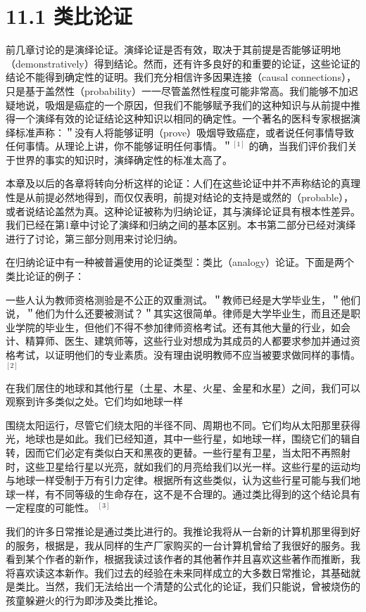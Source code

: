 \section*{11.1 类比论证}
前几章讨论的是演绎论证。演绎论证是否有效，取决于其前提是否能够证明地（demonstratively）得到结论。然而，还有许多良好的和重要的论证，这些论证的结论不能得到确定性的证明。我们充分相信许多因果连接（causal connections），只是基于盖然性（probability）一一尽管盖然性程度可能非常高。我们能够不加迟疑地说，吸烟是癌症的一个原因，但我们不能够赋予我们的这种知识与从前提中推得一个演绎有效的论证结论这种知识以相同的确定性。一个著名的医科专家根据演绎标准声称：＂没有人将能够证明（prove）吸烟导致癌症，或者说任何事情导致任何事情。从理论上讲，你不能够证明任何事情。＂${ }^{[1]}$ 的确，当我们评价我们关于世界的事实的知识时，演绎确定性的标准太高了。

本章及以后的各章将转向分析这样的论证：人们在这些论证中并不声称结论的真理性是从前提必然地得到，而仅仅表明，前提对结论的支持是或然的（probable），或者说结论盖然为真。这种论证被称为归纳论证，其与演绎论证具有根本性差异。我们已经在第1章中讨论了演绎和归纳之间的基本区别。本书第二部分已经对演绎进行了讨论，第三部分则用来讨论归纳。

在归纳论证中有一种被普遍使用的论证类型：类比（analogy）论证。下面是两个类比论证的例子：

一些人认为教师资格测验是不公正的双重测试。＂教师已经是大学毕业生，＂他们说，＂他们为什么还要被测试？＂其实这很简单。律师是大学毕业生，而且还是职业学院的毕业生，但他们不得不参加律师资格考试。还有其他大量的行业，如会计、精算师、医生、建筑师等，这些行业对想成为其成员的人都要求参加并通过资格考试，以证明他们的专业素质。没有理由说明教师不应当被要求做同样的事情。 ${ }^{[2]}$

在我们居住的地球和其他行星（土星、木星、火星、金星和水星）之间，我们可以观察到许多类似之处。它们均如地球一样

围绕太阳运行，尽管它们绕太阳的半径不同、周期也不同。它们均从太阳那里获得光，地球也是如此。我们已经知道，其中一些行星，如地球一样，围绕它们的辑自转，因而它们必定有类似白天和黑夜的更替。一些行星有卫星，当太阳不再照射时，这些卫星给行星以光亮，就如我们的月亮给我们以光一样。这些行星的运动均与地球一样受制于万有引力定律。根据所有这些类似，认为这些行星可能与我们地球一样，有不同等级的生命存在，这不是不合理的。通过类比得到的这个结论具有一定程度的可能性。 ${ }^{[3]}$

我们的许多日常推论是通过类比进行的。我推论我将从一台新的计算机那里得到好的服务，根据是，我从同样的生产厂家购买的一台计算机曾给了我很好的服务。我看到某个作者的新作，根据我读过该作者的其他著作并且喜欢这些著作而推断，我将喜欢读这本新作。我们过去的经验在未来同样成立的大多数日常推论，其基础就是类比。当然，我们无法给出一个清楚的公式化的论证，我们只能说，曾被烧伤的孩童躲避火的行为即涉及类比推论。

